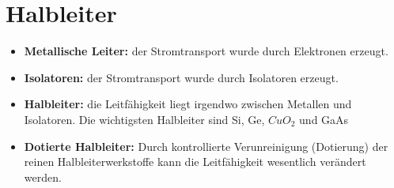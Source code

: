 \renewcommand{\arraystretch}{0.6}
\section{Halbleiter}
\begin{itemize}
    \item \textbf{Metallische Leiter:} der Stromtransport wurde durch Elektronen erzeugt.
    \item \textbf{Isolatoren:} der Stromtransport wurde durch Isolatoren erzeugt.
    \item \textbf{Halbleiter:} die Leitfähigkeit liegt irgendwo zwischen Metallen und Isolatoren.
    \subitem  Die wichtigsten Halbleiter sind  Si, Ge, $CuO_2$ und GaAs 
    \item \textbf{Dotierte Halbleiter:} Durch kontrollierte Verunreinigung (Dotierung) der reinen Halbleiterwerkstoffe kann die Leitfähigkeit wesentlich verändert werden.
\end{itemize}
